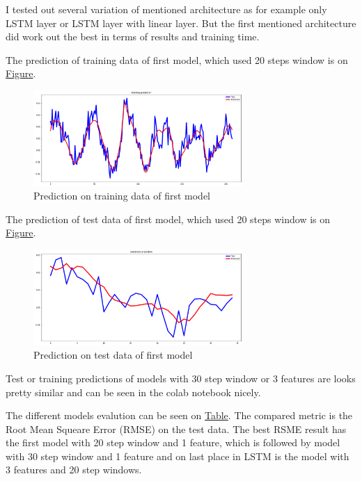 \documentclass[11pt]{article}
\begin{document}
I tested out several variation of mentioned architecture as for example only LSTM layer or LSTM layer with linear layer. But the first mentioned architecture did work out the best in terms of results and training time.

The prediction of training data of first model, which used 20 steps window is on \hyperref[fig-first_train_model]{Figure}.
\begin{figure}[h]
\centering
\includegraphics[width=300px]{training.png}
\caption{\label{fig-first_train_model}Prediction on training data of first model}
\end{figure}


The prediction of test data of first model, which used 20 steps window is on \hyperref[fig-first_model]{Figure}.
\begin{figure}[h]
\centering
\includegraphics[width=300px]{20steps_1feat_val.png}
\caption{\label{fig-first_model}Prediction on test data of first model}
\end{figure}

Test or training predictions of models with 30 step window or 3 features are looks pretty similar and can be seen in the colab notebook nicely.

The different models evalution can be seen on \hyperref[my-table]{Table}. The compared metric is the Root Mean Squeare Error (RMSE) on the test data. The best RSME result has the first model with 20 step window and 1 feature, which is followed by model with 30 step window and 1 feature and on last place in LSTM is the model with 3 features and 20 step windows.
\end{document}
